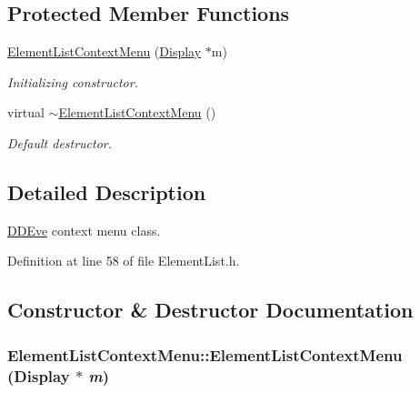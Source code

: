 \subsection*{Protected Member Functions}
\begin{DoxyCompactItemize}
\item 
\hyperlink{class_d_d4hep_1_1_element_list_context_menu_a4966940ed6af2cd74f03ed3c9dec2eb0}{ElementListContextMenu} (\hyperlink{class_d_d4hep_1_1_display}{Display} $\ast$m)
\begin{DoxyCompactList}\small\item\em Initializing constructor. \item\end{DoxyCompactList}\item 
virtual \hyperlink{class_d_d4hep_1_1_element_list_context_menu_afb7e217c0f5eeeb14ab40b6e375bae39}{$\sim$ElementListContextMenu} ()
\begin{DoxyCompactList}\small\item\em Default destructor. \item\end{DoxyCompactList}\end{DoxyCompactItemize}


\subsection{Detailed Description}
\hyperlink{struct_d_d4hep_1_1_d_d_eve}{DDEve} context menu class. 

Definition at line 58 of file ElementList.h.

\subsection{Constructor \& Destructor Documentation}
\hypertarget{class_d_d4hep_1_1_element_list_context_menu_a4966940ed6af2cd74f03ed3c9dec2eb0}{
\subsubsection[{ElementListContextMenu}]{\setlength{\rightskip}{0pt plus 5cm}ElementListContextMenu::ElementListContextMenu ({\bf Display} $\ast$ {\em m})}}
\label{class_d_d4hep_1_1_element_list_context_menu_a4966940ed6af2cd74f03ed3c9dec2eb0}


